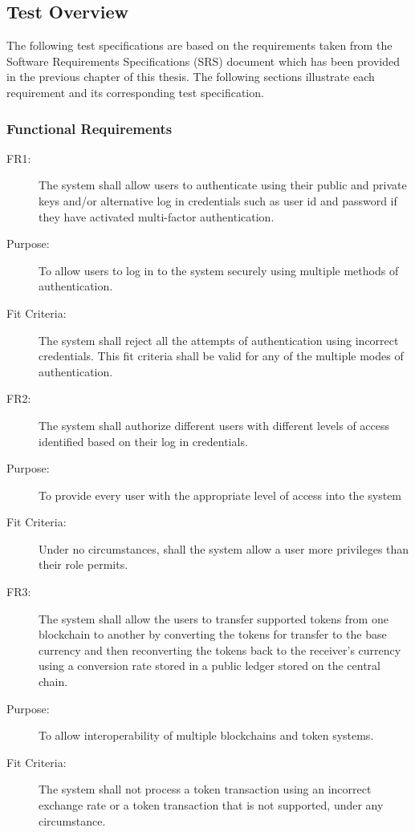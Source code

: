 \documentclass[a4paper,twoside,phd]{BYUPhys}
\begin{document}
\subsection{Test Overview}
The following test specifications are based on the requirements taken from the Software Requirements Specifications (SRS) document which has been provided in the previous chapter of this thesis. The following sections illustrate each requirement and its corresponding test specification. 
\subsubsection{Functional Requirements}
\begin{description}
\item[FR1:] The system shall allow users to authenticate using their public and private keys and/or alternative log in credentials such as user id and password if they have activated multi-factor authentication.
\item[Purpose:] To allow users to log in to the system securely using multiple methods of authentication.
\item[Fit Criteria:] The system shall reject all the attempts of authentication using incorrect credentials. This fit criteria shall be valid for any of the multiple modes of authentication.
\\
\item[FR2:] The  system  shall  authorize  different  users  with  different  levels  of  access identified based on their log in credentials.
\item[Purpose:] To provide every user with the appropriate level of access into the system 
\item[Fit Criteria:] Under no circumstances, shall the system allow a user more privileges than their role permits.
\\
\item[FR3:] The system shall allow the users to transfer supported tokens from one blockchain to another by converting the tokens for transfer to the base currency and then reconverting  the  tokens  back  to  the  receiver’s  currency  using  a  conversion  rate stored in a public ledger stored on the central chain.
\item[Purpose:] To allow interoperability of multiple blockchains and token systems.
\item[Fit Criteria:] The system shall not process a token transaction using an incorrect exchange rate or a token transaction that is not supported, under any circumstance.

\end{description}
\end{document}
